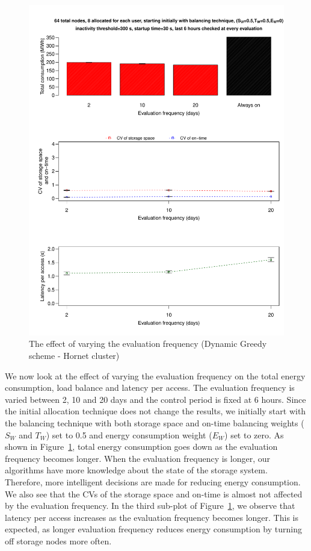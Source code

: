 \begin{figure}[!htbp]
\centering
\includegraphics[width=\columnwidth,keepaspectratio]{FIG10.pdf}
\caption{The effect of varying the evaluation frequency (Dynamic Greedy scheme - Hornet cluster)}
\label{fifthresult}
\end{figure}

We now look at the effect of varying the evaluation frequency on the total energy consumption,
load balance and latency per access. The evaluation frequency is varied between 2, 10 and 20 days
and the control period is fixed at 6 hours. Since the initial allocation technique does not change
the results, we initially start with the balancing technique with both storage space and on-time
balancing weights ($S_W$ and $T_W$) set to 0.5 and energy consumption weight ($E_W$) set to zero.
As shown in Figure~\ref{fifthresult}, total energy consumption goes down as the evaluation frequency
becomes longer. When the evaluation frequency is longer, our algorithms have more knowledge about
the state of the storage system. Therefore, more intelligent decisions are made for reducing energy
consumption. We also see that the CVs of the storage space and on-time is almost not affected by
the evaluation frequency. In the third sub-plot of Figure~\ref{fifthresult}, we observe that latency
per access increases as the evaluation frequency becomes longer. This is expected, as longer evaluation
frequency reduces energy consumption by turning off storage nodes more often. 

